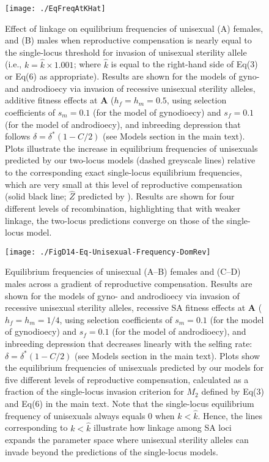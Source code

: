 \documentclass{article}
\begin{document}
\begin{figure}[ht!]
\centering
\texttt{[image: ./EqFreqAtKHat]}
\caption{Effect of linkage on equilibrium frequencies of unisexual (A) females, and (B) males when reproductive compensation is nearly equal to the single-locus threshold for invasion of unisexual sterility allele (i.e., $k = \hat{k} \times 1.001$; where $\hat{k}$ is equal to the right-hand side of Eq(3) or Eq(6) as appropriate). Results are shown for the models of gyno- and androdioecy via invasion of recessive unisexual sterility alleles, additive fitness effects at $\mathbf{A}$ ($h_f = h_m = 0.5$, using selection coefficients of $s_m = 0.1$ (for the model of gynodioecy) and $s_f = 0.1$ (for the model of androdioecy), and inbreeding depression that follows $\delta = \delta^\ast(1 - C/2)$ (see Models section in the main text). Plots illustrate the increase in equilibrium frequencies of unisexuals predicted by our two-locus models (dashed greyscale lines) relative to the corresponding exact single-locus equilibrium frequencies, which are very small at this level of reproductive compensation (solid black line; $\hat{Z}$ predicted by \citealt{Charlesworth1978a}). Results are shown for four different levels of recombination, highlighting that with weaker linkage, the two-locus predictions converge on those of the single-locus model.}
\label{fig:eqFreq2v1Loc}
\end{figure}
\newpage{}

\begin{figure}[ht!]
\centering
\texttt{[image: ./FigD14-Eq-Unisexual-Frequency-DomRev]}
\caption{Equilibrium frequencies of unisexual (A--B) females and (C--D) males across a gradient of reproductive compensation. Results are shown for the models of gyno- and androdioecy via invasion of recessive unisexual sterility alleles, recessive SA fitness effects at $\mathbf{A}$ ($h_f = h_m = 1/4$, using selection coefficients of $s_m = 0.1$ (for the model of gynodioecy) and $s_f = 0.1$ (for the model of androdioecy), and inbreeding depression that decreases linearly with the selfing rate: $\delta = \delta^\ast(1 - C/2)$ (see Models section in the main text). Plots show the equilibrium frequencies of unisexuals predicted by our models for five different levels of reproductive compensation, calculated as a fraction of the single-locus invasion criterion for $M_2$ defined by Eq(3) and Eq(6) in the main text. Note that the single-locus equilibrium frequency of unisexuals always equals $0$ when $k < \hat{k}$. Hence, the lines corresponding to $k < \hat{k}$ illustrate how linkage among SA loci expands the parameter space where unisexual sterility alleles can invade beyond the predictions of the single-locus models.}
\label{fig:eqFreqDomRev}
\end{figure}
\newpage{}
\end{document}
